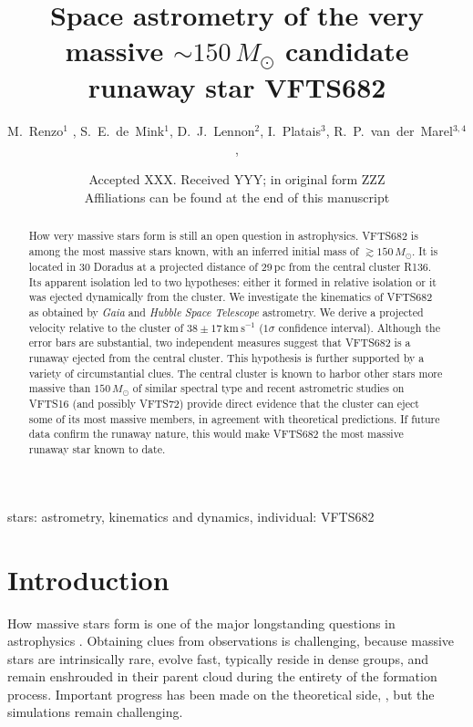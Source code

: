 \documentclass[a4paper,fleqn,usenatbib]{mnras}
\title[Space astrometry of the very massive $\sim$$150\,M_\odot$ candidate runaway star VFTS682]{Space astrometry of the very massive $\sim$$150\,M_\odot$  candidate runaway star VFTS682}
\author[Renzo et al.]{M.~Renzo$^{1}$%
  , S.~E.~de~Mink$^{1}$, D.~J.~Lennon$^{2}$, I.~Platais$^{3}$,
  R.~P.~van~der~Marel$^{3,4}$,
  \newauthor{E.~Laplace$^{1}$, J.~M.~Bestenlehner$^{5}$, C.~J.~Evans$^{6}$,
    V.~H\'enault-Brunet$^{7}$,  S.~Justham$^{8,9,1}$,
  }
\newauthor{A.~de~Koter$^{1}$,
      N.~Langer$^{10}$, F. Najarro$^{11}$, H.~Sana$^{12}$, F.~R.~N.~Schneider$^{13}$, J.~S.~Vink$^{14}$}}
\date{Accepted XXX. Received YYY; in original form ZZZ \\ Affiliations
can be found at the end of this manuscript}
\newcommand{\kms}{{\,\mathrm{km\ s^{-1}}}}
\begin{document}
\label{firsxtpage}
\pagerange{\pageref{firstpage}--\pageref{lastpage}}
\maketitle

\begin{abstract}
 
How very massive stars form is still an open question in
astrophysics. VFTS682 is among the most massive stars known,
with an inferred initial mass of $\gtrsim$$150\,M_\odot$. It is located
in 30 Doradus at a projected distance of 29\,pc from the central
cluster R136. 
Its apparent isolation led to two hypotheses: 
either it formed in relative isolation 
or it was ejected dynamically from the cluster. 
We investigate the kinematics of
VFTS682 as obtained by \emph{Gaia} and \emph{Hubble Space Telescope} astrometry. We derive a projected velocity relative to
the cluster of $38\pm17\kms$ ($1\sigma$ confidence interval). Although
the error bars are substantial, two independent measures
suggest that VFTS682 is a runaway
ejected from the central cluster. This hypothesis is further supported by a variety of
circumstantial clues. The central cluster is known to harbor 
other stars more massive than $150\,M_\odot$ of similar spectral
type and recent astrometric studies on VFTS16 (and possibly VFTS72)
provide direct evidence that the cluster can eject some of its most
massive members, in agreement with theoretical predictions.
If future data confirm the runaway nature, this would make VFTS682
the most massive runaway star known to date. 
\end{abstract}

\begin{keywords}
  stars: astrometry, kinematics and dynamics, individual: VFTS682
\end{keywords}

\section{Introduction}
\label{sec:intro}

How massive stars form is one of the major longstanding questions in astrophysics
\citep[e.g.,][]{zinnecker:07}. %
%
Obtaining clues from observations is challenging, because massive stars are intrinsically rare, 
evolve fast, typically reside in dense groups, and remain enshrouded in
their parent cloud during the entirety of the formation
process. Important progress has been made on the theoretical side,
\citep[e.g.][]{bate:09,kuiper:15,rosen:16}, but the simulations %
remain challenging.  
\end{document}
